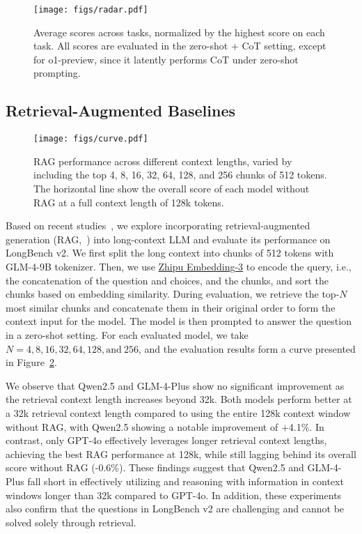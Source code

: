 \begin{figure}[t]
    \centering
    \texttt{[image: figs/radar.pdf]}
    \caption{Average scores across tasks, normalized by the highest score on each task. All scores are evaluated in the zero-shot + CoT setting, except for o1-preview, since it latently performs CoT under zero-shot prompting.}
    \label{fig:radar}
\end{figure}

\subsection{Retrieval-Augmented Baselines}

\begin{figure}[t]
    \centering
    \texttt{[image: figs/curve.pdf]}
    \caption{RAG performance across different context lengths, varied by including the top 4, 8, 16, 32, 64, 128, and 256 chunks of 512 tokens. The horizontal line show the overall score of each model without RAG at a full context length of 128k tokens.}
    \label{fig:rag}
\end{figure}

Based on recent studies~\cite{jiang2024longrag,jin2024long,leng2024long}, we explore incorporating retrieval-augmented generation (RAG,~\citet{lewis2020retrieval}) into long-context LLM and evaluate its performance on LongBench v2.
We first split the long context into chunks of 512 tokens with GLM-4-9B tokenizer. Then, we use \href{https://open.bigmodel.cn/pricing}{Zhipu Embedding-3} to encode the query, i.e., the concatenation of the question and choices, and the chunks, and sort the chunks based on embedding similarity.
During evaluation, we retrieve the top-$N$ most similar chunks and concatenate them in their original order to form the context input for the model. The model is then prompted to answer the question in a zero-shot setting. For each evaluated model, we take $N = 4, 8, 16, 32, 64, 128, \text{and}\ 256$, and the evaluation results form a curve presented in Figure~\ref{fig:rag}.

We observe that Qwen2.5 and GLM-4-Plus show no significant improvement as the retrieval context length increases beyond 32k. Both models perform better at a 32k retrieval context length compared to using the entire 128k context window without RAG, with Qwen2.5 showing a notable improvement of +4.1\%. 
In contrast, only GPT-4o effectively leverages longer retrieval context lengths, achieving the best RAG performance at 128k, while still lagging behind its overall score without RAG (-0.6\%).
These findings suggest that Qwen2.5 and GLM-4-Plus fall short in effectively utilizing and reasoning with information in context windows longer than 32k compared to GPT-4o.
In addition, these experiments also confirm that the questions in LongBench v2 are challenging and cannot be solved solely through retrieval.

